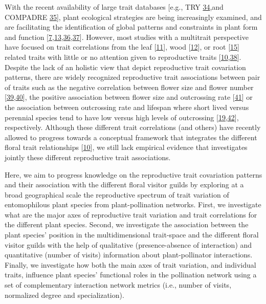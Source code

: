 \documentclass[
  12pt,
  a4paper,
]{article}
\begin{document}
With the recent availability of large trait databases {[}e.g., TRY \protect\hyperlink{ref-kattge2011}{34},and COMPADRE \protect\hyperlink{ref-salguero2015}{35}{]}, plant ecological strategies are being increasingly examined, and are facilitating the identification of global patterns and constraints in plant form and function {[}\protect\hyperlink{ref-salguero2016}{7},\protect\hyperlink{ref-diaz2016}{13},\protect\hyperlink{ref-bruelheide2018}{36},\protect\hyperlink{ref-carmona2021}{37}{]}. However, most studies with a multitrait perspective have focused on trait correlations from the leaf {[}\protect\hyperlink{ref-wright2004}{11}{]}, wood {[}\protect\hyperlink{ref-chave2009}{12}{]}, or root {[}\protect\hyperlink{ref-laughlin2021}{15}{]} related traits with little or no attention given to reproductive traits {[}\protect\hyperlink{ref-roddy2021}{10},\protect\hyperlink{ref-evojtko2020}{38}{]}. Despite the lack of an holistic view that depict reproductive trait covariation patterns, there are widely recognized reproductive trait associations between pair of traits such as the negative correlation between flower size and flower number {[}\protect\hyperlink{ref-sargent2007}{39},\protect\hyperlink{ref-kettle2011}{40}{]}, the positive association between flower size and outcrossing rate {[}\protect\hyperlink{ref-goodwillie2010}{41}{]} or the association between outcrossing rate and lifespan where short lived versus perennial species tend to have low versus high levels of outcrossing {[}\protect\hyperlink{ref-moeller2017}{19},\protect\hyperlink{ref-barrett2003}{42}{]}, respectively. Although these different trait correlations (and others) have recently allowed to progress towards a conceptual framework that integrates the different floral trait relationships {[}\protect\hyperlink{ref-roddy2021}{10}{]}, we still lack empirical evidence that investigates jointly these different reproductive trait associations.

Here, we aim to progress knowledge on the reproductive trait covariation patterns and their association with the different floral visitor guilds by exploring at a broad geographical scale the reproductive spectrum of trait variation of entomophilous plant species from plant-pollination networks. First, we investigate what are the major axes of reproductive trait variation and trait correlations for the different plant species. Second, we investigate the association between the plant species' position in the multidimensional trait-space and the different floral visitor guilds with the help of qualitative (presence-absence of interaction) and quantitative (number of visits) information about plant-pollinator interactions. Finally, we investigate how both the main axes of trait variation, and individual traits, influence plant species' functional roles in the pollination network using a set of complementary interaction network metrics (i.e., number of visits, normalized degree and specialization).
\end{document}
